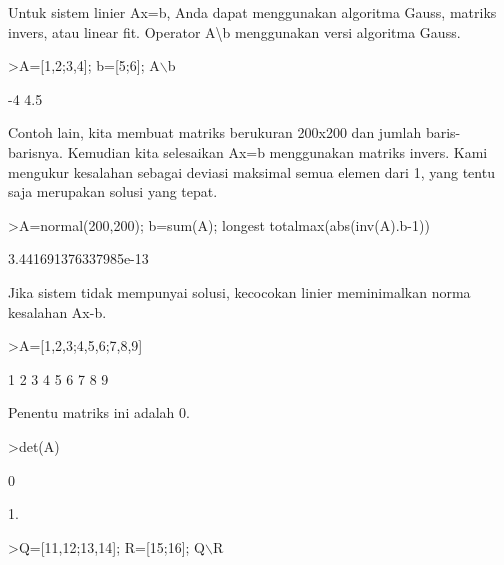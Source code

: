 \documentclass[a4paper,10pt]{article}
\begin{document}
\begin{eulernotebook}
\begin{eulercomment}
\begin{eulercomment}
\begin{eulercomment}
\begin{eulercomment}
\begin{eulercomment}
\begin{eulercomment}
\begin{eulercomment}
\begin{eulercomment}
\begin{eulercomment}
Untuk sistem linier Ax=b, Anda dapat menggunakan algoritma Gauss,
matriks invers, atau linear fit. Operator A\textbackslash{}b menggunakan versi
algoritma Gauss.
\end{eulercomment}
\begin{eulerprompt}
>A=[1,2;3,4]; b=[5;6]; A\(\backslash\)b
\end{eulerprompt}
\begin{euleroutput}
             -4 
            4.5 
\end{euleroutput}
\begin{eulercomment}
Contoh lain, kita membuat matriks berukuran 200x200 dan jumlah
baris-barisnya. Kemudian kita selesaikan Ax=b menggunakan matriks
invers. Kami mengukur kesalahan sebagai deviasi maksimal semua elemen
dari 1, yang tentu saja merupakan solusi yang tepat.
\end{eulercomment}
\begin{eulerprompt}
>A=normal(200,200); b=sum(A); longest totalmax(abs(inv(A).b-1))
\end{eulerprompt}
\begin{euleroutput}
    3.441691376337985e-13 
\end{euleroutput}
\begin{eulercomment}
Jika sistem tidak mempunyai solusi, kecocokan linier meminimalkan
norma kesalahan Ax-b.
\end{eulercomment}
\begin{eulerprompt}
>A=[1,2,3;4,5,6;7,8,9]
\end{eulerprompt}
\begin{euleroutput}
              1             2             3 
              4             5             6 
              7             8             9 
\end{euleroutput}
\begin{eulercomment}
Penentu matriks ini adalah 0.
\end{eulercomment}
\begin{eulerprompt}
>det(A)
\end{eulerprompt}
\begin{euleroutput}
  0
\end{euleroutput}
\begin{eulercomment}
1.
\end{eulercomment}
\begin{eulerprompt}
>Q=[11,12;13,14]; R=[15;16]; Q\(\backslash\)R
\end{eulerprompt}
\begin{euleroutput}

\end{euleroutput}
\end{eulercomment}
\end{eulercomment}
\end{eulercomment}
\end{eulercomment}
\end{eulercomment}
\end{eulercomment}
\end{eulercomment}
\end{eulercomment}
\end{eulernotebook}
\end{document}
